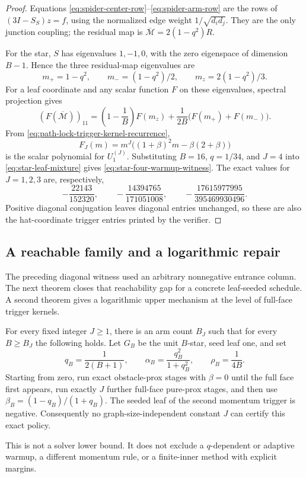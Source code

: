 \documentclass[11pt]{article}
\begin{document}
\begin{proof}
Equations \eqref{eq:spider-center-row}--\eqref{eq:spider-arm-row} are the
rows of \((3I-S_S)z=f\), using the normalized edge weight
\(1/\sqrt{d_id_j}\).  They are the only junction coupling; the residual map
is \(\overline{\mathcal M}=2(1-q^2)R\).

For the star, \(S\) has eigenvalues \(1,-1,0\), with the zero eigenspace of
dimension \(B-1\).  Hence the three residual-map eigenvalues are
\[
 m_+=1-q^2,\qquad m_-=(1-q^2)/2,\qquad
 m_z=2(1-q^2)/3.
\]
For a leaf coordinate and any scalar function \(F\) on these eigenvalues,
spectral projection gives
\begin{equation}
 (F(\overline{\mathcal M}))_{11}
 =\left(1-\frac1B\right)F(m_z)
  +\frac1{2B}\bigl(F(m_+)+F(m_-)\bigr).
 \label{eq:star-leaf-mixture}
\end{equation}
From \eqref{eq:path-lock-trigger-kernel-recurrence},
\[
 F_J(m)=m^J\bigl((1+\beta)^2m-\beta(2+\beta)\bigr)
\]
is the scalar polynomial for \(U_1^{(J)}\).  Substituting
\(B=16\), \(q=1/34\), and \(J=4\) into
\eqref{eq:star-leaf-mixture} gives
\eqref{eq:star-four-warmup-witness}.  The exact values for \(J=1,2,3\) are,
respectively,
\[
 -\frac{22143}{152320},\qquad
 -\frac{14394765}{171051008},\qquad
 -\frac{17615977995}{395469930496}.
\]
Positive diagonal conjugation leaves diagonal entries unchanged, so these
are also the hat-coordinate trigger entries printed by the verifier.
\end{proof}

\subsection{A reachable family and a logarithmic repair}
\label{sec:reachable-star-family}

The preceding diagonal witness used an arbitrary nonnegative entrance
column.  The next theorem closes that reachability gap for a concrete
leaf-seeded schedule.  A second theorem gives a logarithmic upper mechanism
at the level of full-face trigger kernels.

\begin{theorem}
\label{thm:reachable-star-no-constant}
For every fixed integer $J\geq1$, there is an arm count $B_J$ such that for
every $B\geq B_J$ the following holds.  Let $G_B$ be the unit $B$-star, seed
leaf one, and set
\begin{equation}
 q_B=\frac{1}{2(B+1)},\qquad
 \alpha_B=\frac{q_B^2}{1+q_B^2},\qquad
 \rho_B=\frac{1}{4B}.
 \label{eq:reachable-star-parameters}
\end{equation}
Starting from zero, run exact obstacle-prox stages with $\beta=0$ until the
full face first appears, run exactly $J$ further full-face pure-prox stages,
and then use $\beta_B=(1-q_B)/(1+q_B)$.  The seeded
leaf of the second momentum trigger is negative.  Consequently no
graph-size-independent constant $J$ can certify this exact policy.

This is not a solver lower bound.  It does not exclude a $q$-dependent or
adaptive warmup, a different momentum rule, or a finite-inner method with
explicit margins.
\end{theorem}
\end{document}
